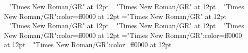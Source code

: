 \documentclass[a4paper]{article}
\begin{document}
\pagestyle{plain}
\sloppy
\setlength{\parfillskip}{0pt plus 1fil}
\font\sectionletter="Times New Roman/GR" at 12pt
\font\articlesectionletter="Times New Roman/GR" at 12pt
\font\sensearticlesectionletter="Times New Roman/GR":color=ff0000 at 12pt
\font\headwordfirstoftypesectionletter="Times New Roman/GR" at 12pt
\font\pronunciationfirstoftypearticlesectionletter="Times New Roman/GR" at 12pt
\font\stressfirstoftypepronunciationfirstoftypearticlesectionletter="Times New Roman/GR" at 12pt
\font\grammarcategoryfirstoftypesensearticlesectionletter="Times New Roman/GR":color=ff0000 at 12pt
\font\exampleusefirstoftypesensearticlesectionletter="Times New Roman/GR":color=ff0000 at 12pt
\font\examplefirstoftypesensearticlesectionletter="Times New Roman/GR":color=ff0000 at 12pt

\mbox{} 
\newpage 
\newpage 
\setcounter{page}{1} 
\pagestyle{fancy} 

\end{document}
